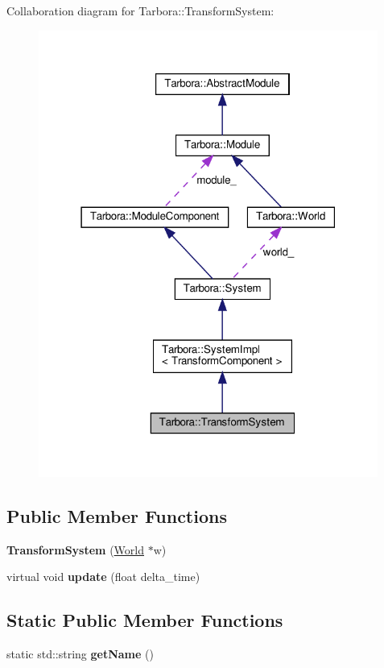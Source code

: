 Collaboration diagram for Tarbora\+:\+:Transform\+System\+:\nopagebreak
\begin{figure}[H]
\begin{center}
\leavevmode
\includegraphics[width=316pt]{classTarbora_1_1TransformSystem__coll__graph}
\end{center}
\end{figure}
\subsection*{Public Member Functions}
\begin{DoxyCompactItemize}
\item 
\mbox{\label{classTarbora_1_1TransformSystem_a90c94d281be61420d0eb656837c3509a}} 
{\bfseries Transform\+System} (\hyperlink{classTarbora_1_1World}{World} $\ast$w)
\item 
\mbox{\label{classTarbora_1_1TransformSystem_a90f8cb678cd0d373fabb39708bcc4b34}} 
virtual void {\bfseries update} (float delta\+\_\+time)
\end{DoxyCompactItemize}
\subsection*{Static Public Member Functions}
\begin{DoxyCompactItemize}
\item 
\mbox{\label{classTarbora_1_1TransformSystem_ac667d039fdd357c857902804138a7c53}} 
static std\+::string {\bfseries get\+Name} ()
\end{DoxyCompactItemize}
